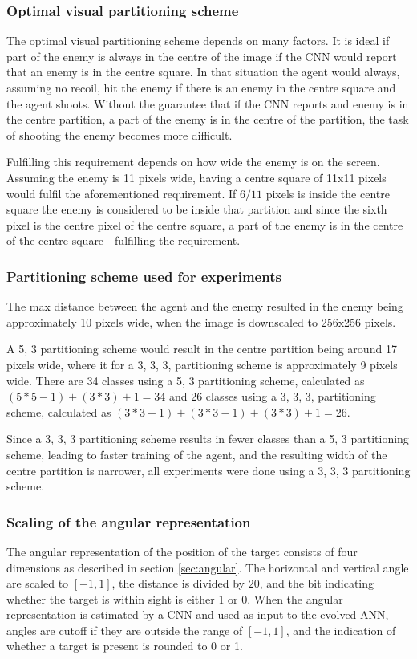 \subsubsection{Optimal visual partitioning scheme}
The optimal visual partitioning scheme depends on many factors. It is ideal if part of the enemy is always in the centre of the image if the CNN would report that an enemy is in the centre square. In that situation the agent would always, assuming no recoil, hit the enemy if there is an enemy in the centre square and the agent shoots. Without the guarantee that if the CNN reports and enemy is in the centre partition, a part of the enemy is in the centre of the partition, the task of shooting the enemy becomes more difficult.

Fulfilling this requirement depends on how wide the enemy is on the screen. Assuming the enemy is 11 pixels wide, having a centre square of 11x11 pixels would fulfil the aforementioned requirement. If $6/11$ pixels is inside the centre square the enemy is considered to be inside that partition and since the sixth pixel is the centre pixel of the centre square, a part of the enemy is in the centre of the centre square - fulfilling the requirement.

\subsubsection{Partitioning scheme used for experiments}
The max distance between the agent and the enemy resulted in the enemy being approximately 10 pixels wide, when the image is downscaled to 256x256 pixels.

A 5, 3 partitioning scheme would result in the centre partition being around 17 pixels wide, where it for a 3, 3, 3, partitioning scheme is approximately 9 pixels wide. There are 34 classes using a 5, 3 partitioning scheme, calculated as $(5*5-1)+(3*3)+1=34$ and 26 classes using a 3, 3, 3, partitioning scheme, calculated as $(3*3-1)+(3*3-1)+(3*3)+1=26$.

Since a 3, 3, 3 partitioning scheme results in fewer classes than a 5, 3 partitioning scheme, leading to faster training of the agent, and the resulting width of the centre partition is narrower, all experiments were done using a 3, 3, 3 partitioning scheme.

\subsubsection{Scaling of the angular representation}
The angular representation of the position of the target consists of four dimensions as described in section \ref{sec:angular}. The horizontal and vertical angle are scaled to $[-1,1]$, the distance is divided by $20$, and the bit indicating whether the target is within sight is either 1 or 0. When the angular representation is estimated by a CNN and used as input to the evolved ANN, angles are cutoff if they are outside the range of $[-1,1]$, and the indication of whether a target is present is rounded to 0 or 1.

